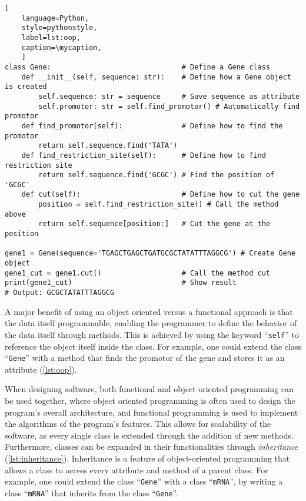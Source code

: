 \def\mycaption{ Example of object oriented programming in Python. The class is
    called ``\texttt{Gene}'' and has four methods, ``\texttt{\_\_init\_\_}'',
    ``\texttt{find\_promotor}'', ``\texttt{find\_restriction\_site}'' and
    ``\texttt{cut}''. The method ``\texttt{\_\_init\_\_}'' is called when
    creating (``initializing'') an object, which fills the object with
    user-defined data. The parameter ``\texttt{self}'' is used to reference the
    object itself internally. ``\texttt{find\_promotor}'' is a
    method that finds the position of the promotor in the gene and is called
    during object initialization. }
\begin{lstlisting}[
    language=Python,
    style=pythonstyle,
    label=lst:oop,
    caption=\mycaption,
    ]
class Gene:                               # Define a Gene class
    def __init__(self, sequence: str):    # Define how a Gene object is created
        self.sequence: str = sequence     # Save sequence as attribute
        self.promotor: str = self.find_promotor() # Automatically find promotor
    def find_promotor(self):              # Define how to find the promotor
        return self.sequence.find('TATA')
    def find_restriction_site(self):      # Define how to find restriction site
        return self.sequence.find('GCGC') # Find the position of 'GCGC'
    def cut(self):                        # Define how to cut the gene
        position = self.find_restriction_site() # Call the method above
        return self.sequence[position:]   # Cut the gene at the position

gene1 = Gene(sequence='TGAGCTGAGCTGATGCGCTATATTTAGGCG') # Create Gene object
gene1_cut = gene1.cut()                   # Call the method cut
print(gene1_cut)                          # Show result
# Output: GCGCTATATTTAGGCG
\end{lstlisting}

A major benefit of using an object oriented versus a functional approach is that
the data itself programmable, enabling the programmer to define the behavior of
the data itself through methods. This is achieved by using the keyword
``\texttt{self}'' to reference the object itself inside the class. For example,
one could extend the class ``\texttt{Gene}'' with a method that finds the
promotor of the gene and stores it as an attribute (\autoref{lst:oop}).

When designing software, both functional and object oriented programming can be
used together, where object oriented programming is often used to design the
program's overall architecture, and functional programming is used to implement
the algorithms of the program's features. This allows for scalability of the
software, as every single class is extended through the addition of new methods.
Furthermore, classes can be expanded in their functionalities through
\emph{inheritance} (\autoref{lst:inheritance}). Inheritance is a feature of
object-oriented programming that allows a class to access every attribute and
method of a parent class. For example, one could extend the class
``\texttt{Gene}'' with a class ``\texttt{mRNA}'', by writing a class
``\texttt{mRNA}'' that inherits from the class ``\texttt{Gene}''.


